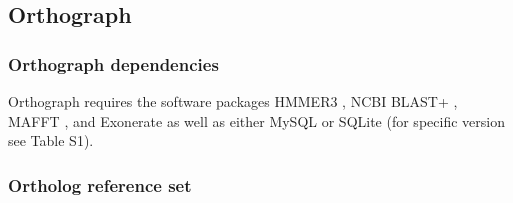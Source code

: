 \subsection{Orthograph}\label{orthograph}

\subsubsection{Orthograph dependencies}\label{orthograph-dependencies}

Orthograph requires the software packages HMMER3 \citep{Eddy2011}, NCBI
BLAST+ \citep{Camacho2009}, MAFFT \citep{Katoh2013}, and Exonerate
\citep{Slater2005} as well as either MySQL or SQLite (for specific
version see Table S1).

\subsubsection{Ortholog reference set}\label{ortholog-reference-set}

